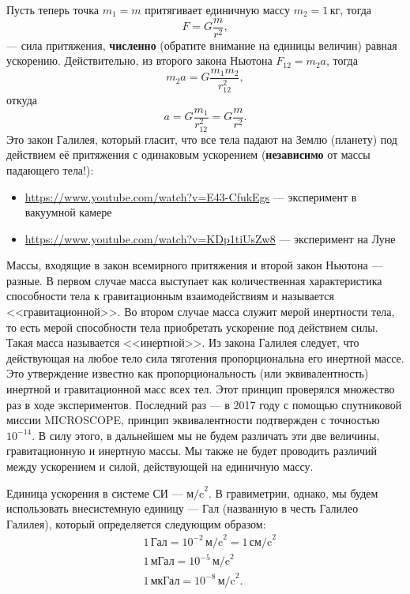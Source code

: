 \documentclass[11pt, a4paper]{article}
\theoremstyle{plain}
\theoremstyle{definition}
\theoremstyle{remark}
\begin{document}
Пусть теперь точка $m_1 = m$ притягивает единичную массу $m_2 = 1\,\text{кг}$, тогда
\begin{equation}
    F = G\dfrac{m}{r^2},
    \label{eq:dynamic}
\end{equation}
--- сила притяжения, \textbf{численно} (обратите внимание на единицы величин) равная ускорению.
Действительно, из второго закона Ньютона $F_{12} = m_2 a$, тогда
\begin{equation*}
    m_2 a = G\dfrac{m_1m_2}{r_{12}^2},
\end{equation*}
откуда 
\begin{equation}
    a = G\dfrac{m_1}{r_{12}^2} = G\dfrac{m}{r^2}.
    \label{eq:kinematic}
\end{equation}
Это закон Галилея, который гласит, что все тела падают на Землю (планету) под действием 
 её притяжения с одинаковым ускорением (\textbf{независимо} от массы падающего тела!):
\begin{itemize}
    \item \url{https://www.youtube.com/watch?v=E43-CfukEgs} --- эксперимент в вакуумной камере
    \item \url{https://www.youtube.com/watch?v=KDp1tiUsZw8} --- эксперимент на Луне
\end{itemize}
Массы, входящие в закон всемирного притяжения и второй закон Ньютона --- разные. В первом случае
масса выступает как количественная характеристика  способности тела к гравитационным
взаимодействиям и называется <<гравитационной>>. Во втором случае масса служит мерой инертности
тела, то есть мерой способности тела приобретать ускорение под действием силы. Такая масса
называется <<инертной>>. Из закона Галилея 
следует, что действующая  на  любое  тело  сила  тяготения  пропорциональна  его  инертной  массе.  Это
утверждение известно как пропорциональность (или эквивалентность) инертной и гравитационной масс
всех тел. Этот принцип проверялся множество раз в ходе экспериментов. Последний раз --- в 2017 году
с помощью спутниковой миссии MICROSCOPE, принцип эквивалентности подтвержден с точностью $10^{-14}$.
В силу этого, в дальнейшем мы не будем различать эти две величины, гравитационную и инертную массы.
Мы также не будет проводить различий между ускорением и силой, действующей на единичную массу.

Единица ускорения в системе СИ --- $\text{м/c}^2$. В гравиметрии, однако, мы будем
использовать внесистемную единицу --- Гал (названную в честь Галилео Галилея), который определяется
следующим образом:
\begin{align*}
    &1\,\text{Гал} = 10^{-2}\,\text{м/c}^2 = 1\,\text{см/c}^2\\
    &1\,\text{мГал} = 10^{-5}\,\text{м/c}^2 \\
    &1\,\text{мкГал} = 10^{-8}\,\text{м/c}^2. 
\end{align*}
\end{document}
